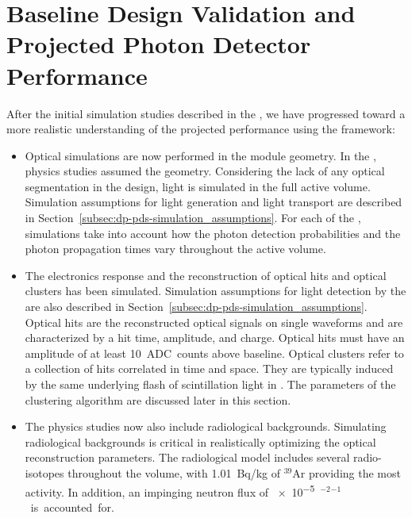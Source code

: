 \section{Baseline Design Validation and Projected Photon Detector Performance}
\label{sec:dp-pds-performance}

After the initial simulation studies described in the  \cite{Abi:2018rgm}, we have progressed toward a more realistic understanding of the projected  performance using the  framework:
%
\begin{itemize}
\item Optical simulations are now performed in the   module geometry. In the  , physics studies assumed the  geometry. Considering the lack of any optical segmentation in the  design, light is simulated in the full \dpactivelarmass {} active volume. Simulation assumptions for light generation and light transport are described in Section~\ref{subsec:dp-pds-simulation_assumptions}. For each of the \dpnumpmtch {}, simulations take into account how the photon detection probabilities and the photon propagation times vary throughout the  active volume.
%
\item The electronics response and the reconstruction of optical hits and optical clusters has been simulated. Simulation assumptions for light detection by the  are also described in Section~\ref{subsec:dp-pds-simulation_assumptions}. Optical hits are the reconstructed optical signals on single  waveforms and are characterized by a hit time, amplitude, and charge. Optical hits must have an amplitude of at least \SI{10}{ADC counts} above baseline. Optical clusters refer to a collection of  hits correlated in time and space. They are typically induced by the same underlying flash of scintillation light in \lar. The parameters of the clustering algorithm are discussed later in this section.


%
\item The physics studies now also include radiological backgrounds. Simulating radiological backgrounds is critical in realistically optimizing the optical reconstruction parameters. The radiological model includes several radio-isotopes throughout the \lar volume, with \SI{1.01}{\becquerel/\kg} of $^{39}$Ar providing the most activity. In addition, an impinging neutron flux of \SI{e-5}{\cm$^{-2}$\s$^{-1}$} is accounted for.
\end{itemize} 

